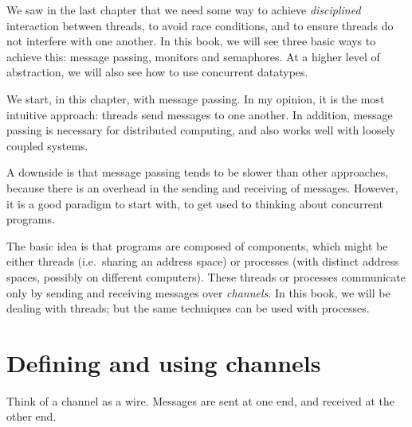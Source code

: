 We saw in the last chapter that we need some way to achieve
\emph{disciplined} interaction between threads, to avoid race conditions, and
to ensure threads do not interfere with one another.  In this book, we will see
three basic ways to achieve this: message passing, monitors and semaphores.
At a higher level of abstraction, we will also see how to use concurrent
datatypes.

We start, in this chapter, with message passing.  In my opinion, it is the
most intuitive approach: threads send messages to one another.  In addition,
message passing is necessary for distributed computing, and also works well
with loosely coupled systems.

A downside is that message passing tends to be slower than other approaches,
because there is an overhead in the sending and receiving of messages.
However, it is a good paradigm to start with, to get used to thinking about
concurrent programs.

The basic idea is that programs are composed of components, which might be
either threads (i.e.~sharing an address space) or processes (with distinct
address spaces, possibly on different computers).  These threads or processes
communicate only by sending and receiving messages over \emph{channels}.  In
this book, we will be dealing with threads; but the same techniques can be
used with processes.


\section{Defining and using channels}

Think of a channel as a wire.  Messages are sent at one end, and received at
the other end.



